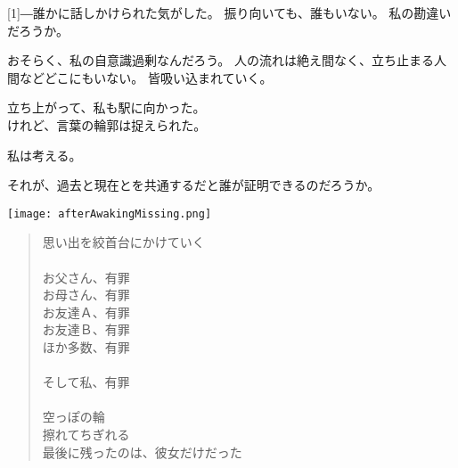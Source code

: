 \documentclass[../IHMain]{subfiles}
\begin{document}
\scalebox{3}[1]{―}誰かに話しかけられた気がした。
振り向いても、誰もいない。
私の勘違いだろうか。

おそらく、私の自意識過剰なんだろう。
人の流れは絶え間なく、立ち止まる人間などどこにもいない。
皆吸い込まれていく。

立ち上がって、私も駅に向かった。\\

けれど、言葉の輪郭は捉えられた。

私は考える。

それが、過去と現在とを共通するだと誰が証明できるのだろうか。

\newpage
\onecolumn
\begin{landscape}
\enlargethispage{200truemm}%
\newpage\thispagestyle{empty}%
\vspace*{-1in}%
\vspace*{-\topmargin}%
\vspace*{-\headheight}%
\vspace*{-\headsep}%
\vspace*{-\topskip}%
\noindent\hspace*{-1in}\hspace*{-\oddsidemargin}%
\texttt{[image: afterAwakingMissing.png]}
\end{landscape}

\tate
    \begin{verse}
    \thispagestyle{empty}
    \clearpage
    \thispagestyle{empty}
    思い出を絞首台にかけていく\\　\\
        
    お父さん、有罪\\
    お母さん、有罪\\
    お友達Ａ、有罪\\
    お友達Ｂ、有罪\\
    ほか多数、有罪\\　\\

    そして私、有罪\\　\\

    空っぽの輪\\
    擦れてちぎれる\\
    最後に残ったのは、彼女だけだった

    \end{verse}
\twocolumn
\end{document}
